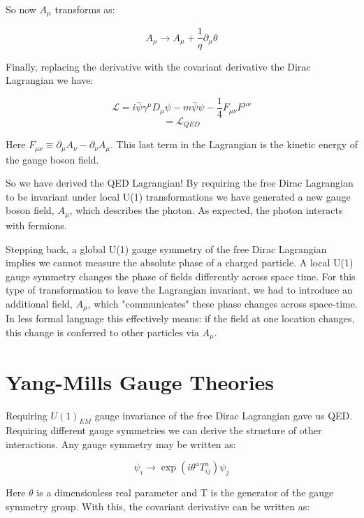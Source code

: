 So now $A_{\mu}$ transforms as:

\begin{equation}
A_{\mu} \rightarrow A_{\mu} + \frac{1}{q}\partial_{\mu}\theta
\end{equation}

Finally, replacing the derivative with the covariant derivative the Dirac Lagrangian we have:

\begin{equation}
\mathcal{L} = i \bar{\psi}\gamma^{\mu}D_{\mu}\psi - m\bar{\psi}\psi - \frac{1}{4}F_{\mu\nu}F^{\mu\nu}
\end{equation}
\begin{equation}
=\mathcal{L}_{QED}
\end{equation}

Here $F_{\mu\nu}\equiv \partial_{\mu}A_{\nu} - \partial_{\nu}A_{\mu}$. This last term in the Lagrangian is the kinetic energy of the gauge boson field.

So we have derived the QED Lagrangian! By requiring the free Dirac Lagrangian to be invariant under local U(1) transformations we have generated a new gauge boson field, $A_{\mu}$, which describes the photon. As expected, the photon interacts with fermions.  

Stepping back, a global U(1) gauge symmetry of the free Dirac Lagrangian implies we cannot measure the absolute phase of a charged particle. A local U(1) gauge symmetry changes the phase of fields differently across space time. For this type of transformation to leave the Lagrangian invariant, we had to introduce an additional field, $A_{\mu}$, which "communicates" these phase changes across space-time. In less formal language this effectively means: if the field at one location changes, this change is conferred to other particles via $A_{\mu}$.

\section{Yang-Mills Gauge Theories}
Requiring $U(1)_{EM}$ gauge invariance of the free Dirac Lagrangian gave us QED. Requiring different gauge symmetries we can derive the structure of other interactions. Any gauge symmetry may be written as:

\begin{equation}
\psi_{i} \rightarrow \exp(i\theta^{a}T^{a}_{ij})\psi_{j}
\end{equation}

Here $\theta$ is a dimensionless real parameter and T is the generator of the gauge symmetry group. With this, the covariant derivative can be written as:

